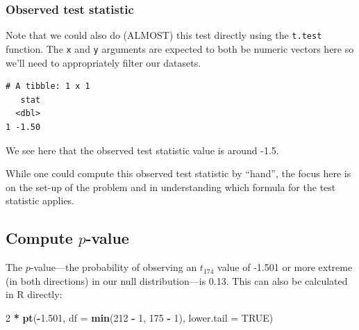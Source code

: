 \documentclass[12pt, krantz2,]{krantz}
\makeatletter
\newenvironment{Shaded}{\begin{snugshade}}{\end{snugshade}}
\newcommand{\DataTypeTok}[1]{\textcolor[rgb]{0.27,0.27,0.27}{#1}}
\newcommand{\DecValTok}[1]{\textcolor[rgb]{0.06,0.06,0.06}{#1}}
\newcommand{\FloatTok}[1]{\textcolor[rgb]{0.06,0.06,0.06}{#1}}
\newcommand{\KeywordTok}[1]{\textcolor[rgb]{0.27,0.27,0.27}{\textbf{#1}}}
\newcommand{\NormalTok}[1]{#1}
\newcommand{\OperatorTok}[1]{\textcolor[rgb]{0.43,0.43,0.43}{\textbf{#1}}}
\newcommand{\OtherTok}[1]{\textcolor[rgb]{0.37,0.37,0.37}{#1}}
\newcommand{\StringTok}[1]{\textcolor[rgb]{0.5,0.5,0.5}{#1}}
\newenvironment{kframe}{%
\medskip{}
\setlength{\fboxsep}{.8em}
 \def\at@end@of@kframe{}%
 \ifinner\ifhmode%
  \def\at@end@of@kframe{\end{minipage}}%
  \begin{minipage}{\columnwidth}%
 \fi\fi%
 \def\FrameCommand##1{\hskip\@totalleftmargin \hskip-\fboxsep
 \colorbox{shadecolor}{##1}\hskip-\fboxsep
     \hskip-\linewidth \hskip-\@totalleftmargin \hskip\columnwidth}%
 \MakeFramed {\advance\hsize-\width
   \@totalleftmargin\z@ \linewidth\hsize
   \@setminipage}}%
 {\par\unskip\endMakeFramed%
 \at@end@of@kframe}
\renewenvironment{Shaded}{\begin{kframe}}{\end{kframe}}
\makeatother
\begin{document}
\hypertarget{observed-test-statistic-3}{%
\subsubsection*{Observed test statistic}\label{observed-test-statistic-3}}


Note that we could also do (ALMOST) this test directly using the \texttt{t.test} function. The \texttt{x} and \texttt{y} arguments are expected to both be numeric vectors here so we'll need to appropriately filter our datasets.

\begin{Shaded}
\end{Shaded}

\begin{verbatim}
# A tibble: 1 x 1
   stat
  <dbl>
1 -1.50
\end{verbatim}

We see here that the observed test statistic value is around -1.5.

While one could compute this observed test statistic by ``hand'', the focus here is on the set-up of the problem and in understanding which formula for the test statistic applies.

\hypertarget{compute-p-value-1}{%
\subsection{\texorpdfstring{Compute \(p\)-value}{Compute p-value}}\label{compute-p-value-1}}

The \(p\)-value---the probability of observing an \(t_{174}\) value of -1.501 or more extreme (in both directions) in our null distribution---is 0.13. This can also be calculated in R directly:

\begin{Shaded}
\begin{Highlighting}[]
\DecValTok{2} \OperatorTok{*}\StringTok{ }\KeywordTok{pt}\NormalTok{(}\OperatorTok{-}\FloatTok{1.501}\NormalTok{, }\DataTypeTok{df =} \KeywordTok{min}\NormalTok{(}\DecValTok{212} \OperatorTok{-}\StringTok{ }\DecValTok{1}\NormalTok{, }\DecValTok{175} \OperatorTok{-}\StringTok{ }\DecValTok{1}\NormalTok{), }\DataTypeTok{lower.tail =} \OtherTok{TRUE}\NormalTok{)}
\end{Highlighting}
\end{Shaded}
\end{document}
